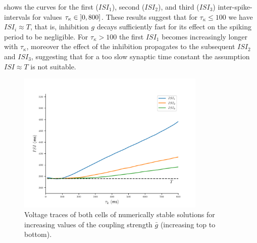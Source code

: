 \documentclass[utf8]{frontiers_suppmat} %
\newcommand{\gbar}{\bar g}
\begin{document}
 shows the curves for the first ($ISI_{1}$), second ($ISI_{2}$), and third ($ISI_{3}$) inter-spike-intervals for values $\tau_{\kappa} \in \interval[open left]{0}{800}$.
These results suggest that for $\tau_\kappa \leq 100$ we have $ISI_i \approx T$, that is, inhibition $g$ decays sufficiently fast for its effect on the spiking period to be negligible.
For $\tau_\kappa > 100$ the first $ISI_{1}$ becomes increasingly longer with $\tau_{\kappa}$, moreover the effect of the inhibition propagates to the subsequent $ISI_{2}$ and $ISI_{3}$, suggesting that for a too slow synaptic time constant the assumption $ISI \approx T$ is not suitable.

\begin{figure}[h!]
	\centering
	\includegraphics[width=0.8\textwidth]{tauk-vs-ISI}
	\caption{Voltage traces of both cells of numerically stable solutions for increasing
		values of the coupling strength $\gbar$ (increasing top to
		bottom).~\label{fig:tauk-vs-ISI}}
\end{figure}




\end{document}
